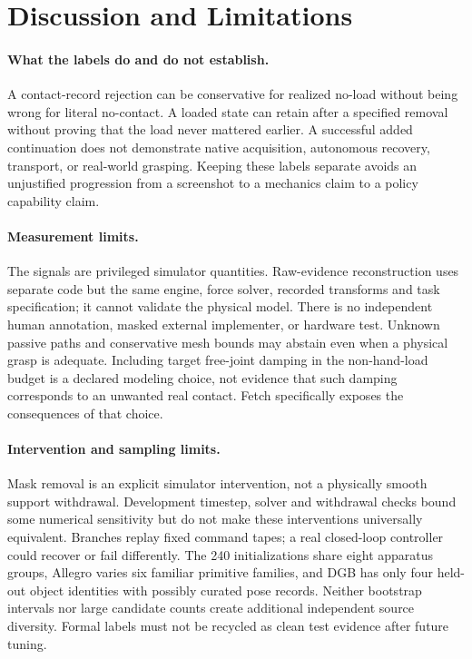 \section{Discussion and Limitations}


\paragraph{What the labels do and do not establish.}
A contact-record rejection can be conservative for realized no-load without
being wrong for literal no-contact. A loaded state can retain after a specified
removal without proving that the load never mattered earlier. A successful
added continuation does not demonstrate native acquisition, autonomous recovery,
transport, or real-world grasping. Keeping these labels separate avoids an
unjustified progression from a screenshot to a mechanics claim to a policy
capability claim.

\paragraph{Measurement limits.}
The signals are privileged simulator quantities. Raw-evidence reconstruction
uses separate code but the same engine, force solver, recorded transforms and
task specification; it cannot validate the physical model. There is no
independent human annotation, masked external implementer, or hardware test.
Unknown passive paths and conservative mesh bounds may abstain even when a
physical grasp is adequate. Including target free-joint damping in the
non-hand-load budget is a declared modeling choice, not evidence that such
damping corresponds to an unwanted real contact. Fetch specifically exposes
the consequences of that choice.

\paragraph{Intervention and sampling limits.}
Mask removal is an explicit simulator intervention, not a physically smooth
support withdrawal. Development timestep, solver and withdrawal checks bound
some numerical sensitivity but do not make these interventions universally
equivalent. Branches replay fixed command tapes; a real closed-loop controller
could recover or fail differently. The 240 initializations share eight
apparatus groups, Allegro varies six familiar primitive families, and DGB has
only four held-out object identities with possibly curated pose records.
Neither bootstrap intervals nor large candidate counts create additional
independent source diversity. Formal labels must not be recycled as clean test
evidence after future tuning.

